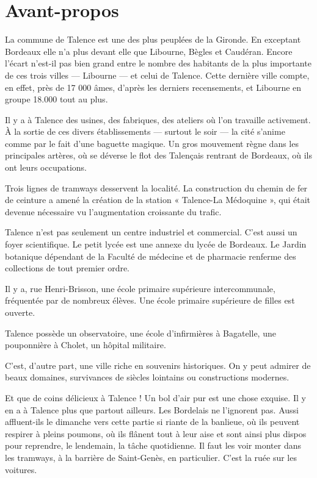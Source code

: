 \chapter*{Avant-propos}

La commune de Talence est une des plus peuplées de la Gironde. En exceptant Bordeaux elle n'a plus devant elle que Libourne, Bègles et Caudéran. Encore l'écart n'est-il pas bien grand entre le nombre des habitants de la plus importante de ces trois villes — Libourne — et celui de Talence. Cette dernière ville compte, en effet, près de 17 000 âmes, d'après les derniers recensements, et Libourne en groupe 18.000 tout au plus.

Il y a à Talence des usines, des fabriques, des ateliers où l'on travaille activement. À la sortie de ces divers établissements — surtout le soir — la cité s'anime comme par le fait d'une baguette magique. Un gros mouvement règne dans les principales artères, où se déverse le flot des Talençais rentrant de Bordeaux, où ils ont leurs occupations.

Trois lignes de tramways desservent la localité. La construction du chemin de fer de ceinture a amené la création de la station « Talence-La Médoquine », qui était devenue nécessaire vu l'augmentation croissante du trafic.

Talence n'est pas seulement un centre industriel et commercial. C'est aussi un foyer scientifique. Le petit lycée est une annexe du lycée de Bordeaux. Le Jardin botanique dépendant de la Faculté de médecine et de pharmacie renferme des collections de tout premier ordre.

Il y a, rue Henri-Brisson, une école primaire supérieure intercommunale, fréquentée par de nombreux élèves. Une école primaire supérieure de filles est ouverte.

Talence possède un observatoire, une école d'infirmières à Bagatelle, une pouponnière à Cholet, un hôpital militaire.

C'est, d'autre part, une ville riche en souvenirs historiques. On y peut admirer de beaux domaines, survivances de siècles lointains ou constructions modernes.

Et que de coins délicieux à Talence ! Un bol d'air pur est une chose exquise. Il y en a à Talence plus que partout ailleurs. Les Bordelais ne l'ignorent pas. Aussi affluent-ils le dimanche vers cette partie si riante de la banlieue, où ils peuvent respirer à pleins poumons, où ils flânent tout à leur aise et sont ainsi plus dispos pour reprendre, le lendemain, la tâche quotidienne. Il faut les voir monter dans les tramways, à la barrière de Saint-Genès, en particulier. C'est la ruée sur les voitures.

